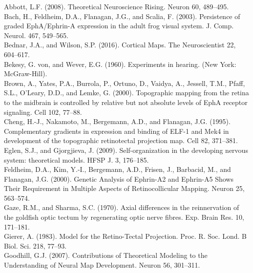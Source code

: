 \documentclass[11pt]{"article"}
\begin{document}
{
Abbott, L.F. (2008). Theoretical Neuroscience Rising. Neuron 60, 489–495. \\

Bach, H., Feldheim, D.A., Flanagan, J.G., and Scalia, F. (2003). Persistence of graded EphA/Ephrin-A expression in the adult frog visual system. J. Comp. Neurol. 467, 549–565. \\

Bednar, J.A., and Wilson, S.P. (2016). Cortical Maps. The Neuroscientist 22, 604–617. \\

Bekesy, G. von, and Wever, E.G. (1960). Experiments in hearing. (New York: McGraw-Hill). \\

Brown, A., Yates, P.A., Burrola, P., Ortuno, D., Vaidya, A., Jessell, T.M., Pfaff, S.L., O'Leary, D.D., and Lemke, G. (2000). Topographic mapping from the retina to the midbrain is controlled by relative but not absolute levels of EphA receptor signaling. Cell 102, 77–88. \\

Cheng, H.-J., Nakamoto, M., Bergemann, A.D., and Flanagan, J.G. (1995). Complementary gradients in expression and binding of ELF-1 and Mek4 in development of the topographic retinotectal projection map. Cell 82, 371–381. \\

Eglen, S.J., and Gjorgjieva, J. (2009). Self-organization in the developing nervous system: theoretical models. HFSP J. 3, 176–185. \\

Feldheim, D.A., Kim, Y.-I., Bergemann, A.D., Frisen, J., Barbacid, M., and Flanagan, J.G. (2000). Genetic Analysis of Ephrin-A2 and Ephrin-A5 Shows Their Requirement in Multiple Aspects of Retinocollicular Mapping. Neuron 25, 563–574. \\

Gaze, R.M., and Sharma, S.C. (1970). Axial differences in the reinnervation of the goldfish optic tectum by regenerating optic nerve fibres. Exp. Brain Res. 10, 171–181. \\

Gierer, A. (1983). Model for the Retino-Tectal Projection. Proc. R. Soc. Lond. B Biol. Sci. 218, 77–93. \\

Goodhill, G.J. (2007). Contributions of Theoretical Modeling to the Understanding of Neural Map Development. Neuron 56, 301–311. \\

}
\end{document}
